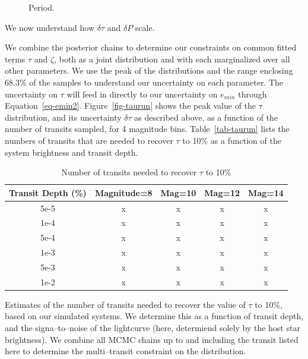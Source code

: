\begin{figure}[t] 
\begin{center} 
\caption{Period.}
\label{fig-mcmc2} 
\end{center} 
\end{figure}

We now understand how $\delta \tau$ and $\delta P$ scale.

\medskip
{\centerline{}}
\smallskip


We combine the posterior chains to determine our constraints on common
fitted terms $\tau$ and $\zeta$, both as a joint distribution and with
each marginalized over all other parameters.  We use the peak of the
distributions and the range enclosing 68.3\% of the samples to
understand our uncertainty on each parameter.  The uncertainty on
$\tau$ will feed in directly to our uncertainty on $e_{min}$ through
Equation~\ref{eq-emin2}.  Figure~\ref{fig-taurun} shows the peak value
of the $\tau$ distribution, and its uncertainty $\delta \tau$ as
described above, as a function of the number of transits sampled, for
4 magnitude bins.  Table~\ref{tab-taurun} lists the numbers of
transits that are needed to recover $\tau$ to 10\% as a function of
the system brightness and transit depth.

\begin{table}[t]
\begin{center}
\caption{\label{table-taurun} Number of transits needed to recover $\tau$ to 10\%}
\begin{tabular}{c|cccc}
\hline \hline
Transit Depth (\%) & Magnitude=8 & Mag=10 & Mag=12 & Mag=14\\
\hline
5e-5 & x & x & x & x \\
1e-4 & x & x & x & x \\
5e-4 & x & x & x & x \\
1e-3 & x & x & x & x \\
5e-3 & x & x & x & x \\
1e-2 & x & x & x & x \\
\hline
\end{tabular}
\end{center}
Estimates of the number of transits needed to recover the value of
$\tau$ to 10\%, based on our simulated systems.  We determine this as
a function of transit depth, and the signa--to--noise of the
lightcurve (here, determiend solely by the host star brightness).  We
combine all MCMC chains up to and including the transit listed here to
determine the multi--transit constraint on the distribution.
\end{table}

